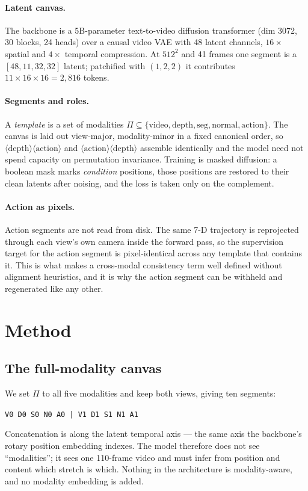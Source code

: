 \documentclass{article}
\begin{document}
\paragraph{Latent canvas.} The backbone is a 5B-parameter text-to-video diffusion transformer
(dim 3072, 30 blocks, 24 heads) over a causal video VAE with 48 latent channels, $16\times$
spatial and $4\times$ temporal compression. At $512^2$ and 41 frames one segment is a
$[48,11,32,32]$ latent; patchified with $(1,2,2)$ it contributes $11\times16\times16=2{,}816$
tokens.

\paragraph{Segments and roles.} A \emph{template} is a set of modalities
$\Pi\subseteq\{\textrm{video},\textrm{depth},\textrm{seg},\textrm{normal},\textrm{action}\}$. The
canvas is laid out view-major, modality-minor in a fixed canonical order, so
$\langle\textrm{depth}\rangle\langle\textrm{action}\rangle$ and
$\langle\textrm{action}\rangle\langle\textrm{depth}\rangle$ assemble identically and the model
need not spend capacity on permutation invariance. Training is masked diffusion: a boolean mask
marks \emph{condition} positions, those positions are restored to their clean latents after
noising, and the loss is taken only on the complement.

\paragraph{Action as pixels.} Action segments are not read from disk. The same 7-D trajectory is
reprojected through each view's own camera inside the forward pass, so the supervision target for
the action segment is pixel-identical across any template that contains it. This is what makes a
cross-modal consistency term well defined without alignment heuristics, and it is why the action
segment can be withheld and regenerated like any other.

\section{Method}
\label{sec:method}

\subsection{The full-modality canvas}
\label{sec:canvas}

We set $\Pi$ to all five modalities and keep both views, giving ten segments:
\begin{center}
\texttt{V0 D0 S0 N0 A0 | V1 D1 S1 N1 A1}
\end{center}
Concatenation is along the latent temporal axis --- the same axis the backbone's rotary position
embedding indexes. The model therefore does not see ``modalities''; it sees one 110-frame video
and must infer from position and content which stretch is which. Nothing in the architecture is
modality-aware, and no modality embedding is added.
\end{document}
